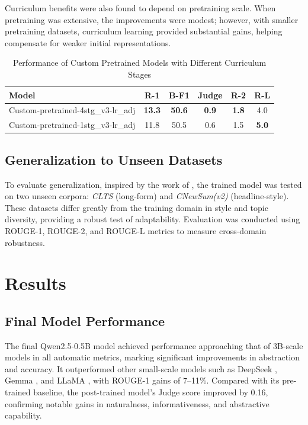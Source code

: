 \documentclass[preprint,12pt]{elsarticle}
\begin{document}
Curriculum benefits were also found to depend on pretraining scale.  
When pretraining was extensive, the improvements were modest; however, with smaller pretraining datasets, curriculum learning provided substantial gains, helping compensate for weaker initial representations.

\begin{table}[t]
\caption{Performance of Custom Pretrained Models with Different Curriculum Stages}
\label{tab:custom_pretrain_stage_comparison}
\centering
\begin{tabular}{lccccc}
\hline
Model & R-1 & B-F1 & Judge & R-2 & R-L \\
\hline
Custom-pretrained-4stg\_v3-lr\_adj & \textbf{13.3} & \textbf{50.6} & \textbf{0.9} & \textbf{1.8} & 4.0 \\
Custom-pretrained-1stg\_v3-lr\_adj & 11.8 & 50.5 & 0.6 & 1.5 & \textbf{5.0} \\
\hline
\end{tabular}
\end{table}

\subsection{Generalization to Unseen Datasets}
To evaluate generalization, inspired by the work of \cite{basyal2023llms}, the trained model was tested on two unseen corpora: \textit{CLTS} \cite{clts} (long-form) and \textit{CNewSum(v2)} \cite{cnewsumv2} (headline-style).  
These datasets differ greatly from the training domain in style and topic diversity, providing a robust test of adaptability.  
Evaluation was conducted using ROUGE-1, ROUGE-2, and ROUGE-L metrics to measure cross-domain robustness.


\section{Results}

\subsection{Final Model Performance}
The final Qwen2.5-0.5B model achieved performance approaching that of 3B-scale models in all automatic metrics, marking significant improvements in abstraction and accuracy.  
It outperformed other small-scale models such as DeepSeek \cite{deepseek-r1}, Gemma \cite{gemma}, and LLaMA \cite{llama3}, with ROUGE-1 gains of 7–11\%.  
Compared with its pre-trained baseline, the post-trained model’s Judge score improved by 0.16, confirming notable gains in naturalness, informativeness, and abstractive capability.
\end{document}
